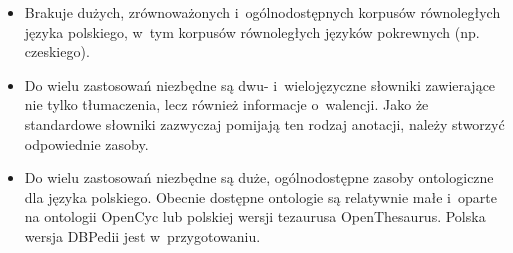 \begin{multicols}{2}
\begin{itemize} \item Brakuje dużych, zrównoważonych
i~ogólnodostępnych korpusów równoległych języka polskiego, w~tym
korpusów równoległych języków pokrewnych (np. czeskiego). \item
Do wielu zastosowań niezbędne są dwu- i~wielojęzyczne słowniki
zawierające nie tylko tłumaczenia, lecz również informacje
o~walencji. Jako że standardowe słowniki zazwyczaj pomijają ten
rodzaj anotacji, należy stworzyć odpowiednie zasoby. \item Do wielu
zastosowań niezbędne są duże, ogólnodostępne zasoby ontologiczne
dla języka polskiego. Obecnie dostępne ontologie są relatywnie
małe i~oparte na ontologii OpenCyc lub polskiej wersji tezaurusa
OpenThesaurus. Polska wersja DBPedii jest w~przygotowaniu.
\end{itemize} 


\end{multicols}
